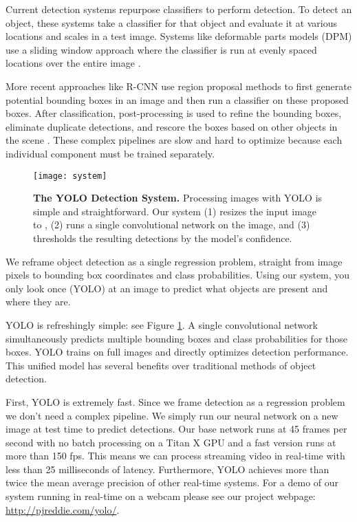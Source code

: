 \documentclass[10pt,twocolumn,letterpaper]{article}
\begin{document}
Current detection systems repurpose classifiers to perform detection. To detect an object, these systems take a classifier for that object and evaluate it at various locations and scales in a test image. Systems like deformable parts models (DPM) use a sliding window approach where the classifier is run at evenly spaced locations over the entire image \cite{lsvm-pami}.

More recent approaches like R-CNN use region proposal methods to first generate potential bounding boxes in an image and then run a classifier on these proposed boxes. After classification, post-processing is used to refine the bounding boxes, eliminate duplicate detections, and rescore the boxes based on other objects in the scene \cite{girshick2014rich}. These complex pipelines are slow and hard to optimize because each individual component must be trained separately.

\begin{figure}[t]
\begin{center}
        \texttt{[image: system]}
\end{center}
   \caption{\small \textbf{The YOLO Detection System.} Processing images with YOLO is simple and straightforward. Our system (1) resizes the input image to , (2) runs a single convolutional network on the image, and (3) thresholds the resulting detections by the model's confidence.}
\label{system}
\end{figure}





We reframe object detection as a single regression problem, straight from image pixels to bounding box coordinates and class probabilities. Using our system, you only look once (YOLO) at an image to predict what objects are present and where they are.

YOLO is refreshingly simple: see Figure \ref{system}. A single convolutional network simultaneously predicts multiple bounding boxes and class probabilities for those boxes. YOLO trains on full images and directly optimizes detection performance. This unified model has several benefits over traditional methods of object detection.

First, YOLO is extremely fast. Since we frame detection as a regression problem we don't need a complex pipeline. We simply run our neural network on a new image at test time to predict detections. Our base network runs at 45 frames per second with no batch processing on a Titan X GPU and a fast version runs at more than 150 fps. This means we can process streaming video in real-time with less than 25 milliseconds of latency. Furthermore, YOLO achieves more than twice the mean average precision of other real-time systems. For a demo of our system running in real-time on a webcam please see our project webpage: \url{http://pjreddie.com/yolo/}.
\end{document}
